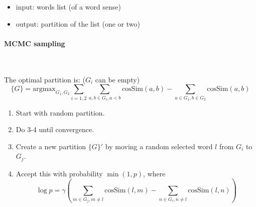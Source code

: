 \documentclass[12pt]{article}
\begin{document}
    \begin{itemize}
        \item input: words list (of a word sense)
        \item output: partition of the list (one or two)
    \end{itemize}
    \paragraph{MCMC sampling}~
    
    The optimal partition is: ($G_i$ can be empty)
    $$\{G\} = \text{argmax}_{G_1,G_2}\sum_{i=1,2}\sum_{a,b\in G_i, a<b}\text{cosSim}(a,b)-\sum_{a\in G_1, b\in G_2}\text{cosSim}(a,b)$$
    \begin{enumerate}
        \item Start with random partition.
        \item Do 3-4 until convergence.
        \item Create a new partition $\{G\}'$ by moving a random selected word $l$ from $G_i$ to $G_j$.
        \item Accept this with probability $\min(1, p)$, where
        $$\log p=\gamma \left(\sum_{m\in G_j,m\neq l} \text{cosSim}(l,m)-\sum_{n\in G_i,n\neq l}\text{cosSim}(l,n)\right)$$
    \end{enumerate}
\end{document}
